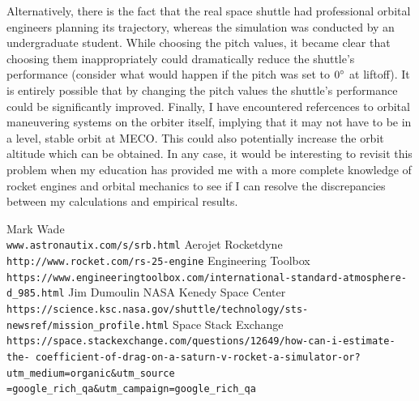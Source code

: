 \documentclass{article}
\begin{document}
Alternatively, there is the fact that the real space shuttle had
professional orbital engineers planning its trajectory, whereas the simulation was conducted by an undergraduate student. While choosing
the pitch values, it became clear that choosing them inappropriately could dramatically reduce the shuttle's performance (consider what would
happen if the pitch was set to $0\degree$ at liftoff). It is entirely possible that by changing the pitch values the shuttle's performance
could be significantly improved. Finally, I have encountered refercences to orbital maneuvering systems on the orbiter itself, implying that it
may not have to be in a level, stable orbit at MECO. This could also potentially increase the orbit altitude which can be obtained.
In any case, it would be interesting to revisit this problem when my education has provided me with a more complete
knowledge of rocket engines and orbital mechanics to see if I can resolve the discrepancies between my calculations and empirical results.

\pagebreak
\begin{thebibliography}{5}
	Mark Wade
	\\\texttt{www.astronautix.com/s/srb.html}
	Aerojet Rocketdyne
	\\\texttt{http://www.rocket.com/rs-25-engine}
	Engineering Toolbox
	\\\texttt{https://www.engineeringtoolbox.com/international-standard-atmosphere-d\_985.html}
	Jim Dumoulin
	NASA Kenedy Space Center
	\\\texttt{https://science.ksc.nasa.gov/shuttle/technology/sts-newsref/mission\_profile.html}
	Space Stack Exchange
	\\\texttt{https://space.stackexchange.com/questions/12649/how-can-i-estimate-the-
coefficient-of-drag-on-a-saturn-v-rocket-a-simulator-or?utm\_medium=organic\&utm\_source
=google\_rich\_qa\&utm\_campaign=google\_rich\_qa}
\end{thebibliography}
\end{document}
